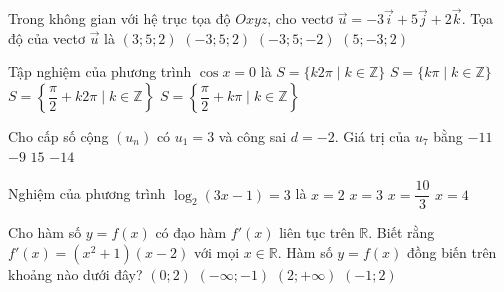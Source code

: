 \begin{ex}%
	Trong không gian với hệ trục tọa độ $Oxyz$, cho vectơ $\vec{u}=-3\vec{i}+5\vec{j}+2\vec{k}$. Tọa độ của vectơ $\vec{u}$ là
	\choice
	{$(3;5;2)$}
	{\True $(-3;5;2)$}
	{$(-3;5;-2)$}
	{$(5;-3;2)$}
\end{ex}
\begin{ex}%
	Tập nghiệm của phương trình $\cos x=0$ là
	\choice
	{$S=\{k2\pi \mid k\in\mathbb{Z}\}$}
	{$S=\{k\pi \mid k\in\mathbb{Z}\}$}
	{$S=\left\{\dfrac{\pi}{2}+k2\pi \mid k\in\mathbb{Z}\right\}$}
	{\True $S=\left\{\dfrac{\pi}{2}+k\pi \mid k\in\mathbb{Z}\right\}$}
\end{ex}
\begin{ex}%
	Cho cấp số cộng $(u_n)$ có $u_1=3$ và công sai $d=-2$. Giá trị của $u_7$ bằng
	\choice
	{$-11$}
	{\True $-9$}
	{$15$}
	{$-14$}
\end{ex}
\begin{ex}%
	Nghiệm của phương trình $\log_2(3x-1)=3$ là
	\choice
	{$x=2$}
	{\True $x=3$}
	{$x=\dfrac{10}{3}$}
	{$x=4$}
\end{ex}
\begin{ex}%
	Cho hàm số $y=f(x)$ có đạo hàm $f'(x)$ liên tục trên $\mathbb{R}$. Biết rằng $f'(x)=(x^2+1)(x-2)$ với mọi $x\in\mathbb{R}$. Hàm số $y=f(x)$ đồng biến trên khoảng nào dưới đây?
	\choice
	{$(0;2)$}
	{$(-\infty;-1)$}
	{\True $(2;+\infty)$}
	{$(-1;2)$}
\end{ex}

